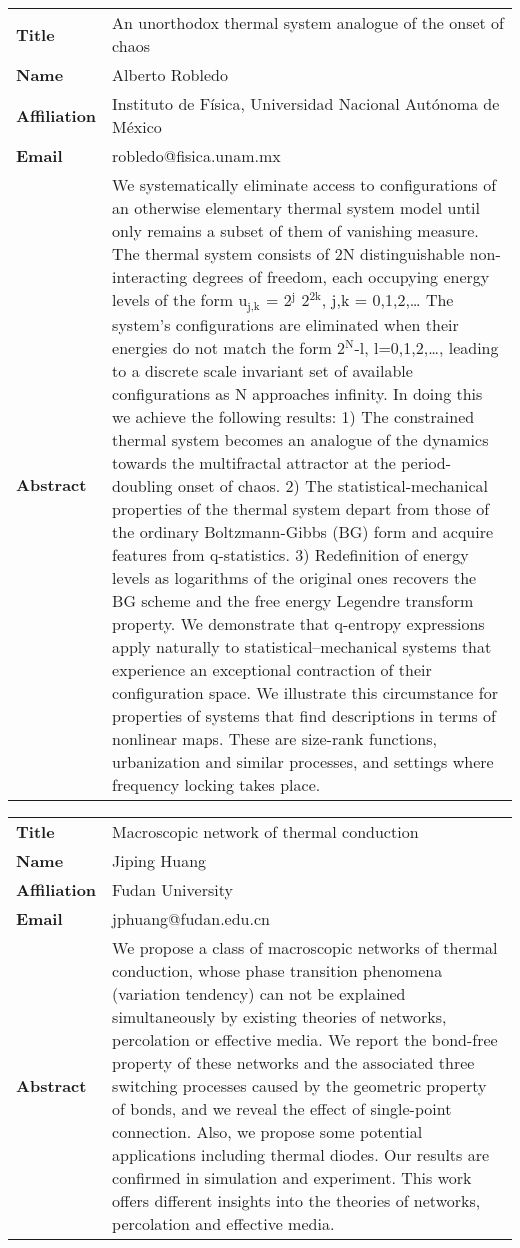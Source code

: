 \documentclass[oneside,A4paper,12pt]{article}
\begin{document}
\begin{longtable}{p{2cm}p{14cm}}
\toprule
\textbf{Title} & An unorthodox thermal system analogue of the onset of chaos\\
\textbf{Name} & Alberto Robledo\\
\textbf{Affiliation} & Instituto de Física, Universidad Nacional Autónoma de México\\
\textbf{Email} & robledo@fisica.unam.mx\\
\textbf{Abstract} & We systematically eliminate access to configurations of an otherwise elementary thermal system model until only remains a subset of them of vanishing measure. The thermal system consists of 2N distinguishable non-interacting degrees of freedom, each occupying energy levels of the form u\(_{\text{j,k}}\) = 2\(^{\text{j}}\) 2\(^{\text{2k}}\), j,k = 0,1,2,\ldots{} The system's configurations are eliminated when their energies do not match the form 2\(^{\text{N}}\)-l, l=0,1,2,\ldots{}, leading to a discrete scale invariant set of available configurations as N approaches infinity. In doing this we achieve the following results: 1) The constrained thermal system becomes an analogue of the dynamics towards the multifractal attractor at the period-doubling onset of chaos. 2) The statistical-mechanical properties of the thermal system depart from those of the ordinary Boltzmann-Gibbs (BG) form and acquire features from q-statistics. 3) Redefinition of energy levels as logarithms of the original ones recovers the BG scheme and the free energy Legendre transform property. We demonstrate that q-entropy expressions apply naturally to statistical–mechanical systems that experience an exceptional contraction of their configuration space. We illustrate this circumstance for properties of systems that find descriptions in terms of nonlinear maps. These are size-rank functions, urbanization and similar processes, and settings where frequency locking takes place.\\
\bottomrule
\end{longtable}

\newpage
\begin{longtable}{p{2cm}p{14cm}}
\toprule
\textbf{Title} & Macroscopic network of thermal conduction\\
\textbf{Name} & Jiping Huang\\
\textbf{Affiliation} & Fudan University\\
\textbf{Email} & jphuang@fudan.edu.cn\\
\textbf{Abstract} & We propose a class of macroscopic networks of thermal conduction, whose phase transition phenomena (variation tendency) can not be explained simultaneously by existing theories of networks, percolation or effective media. We report the bond-free property of these networks and the associated three switching processes caused by the geometric property of bonds, and we reveal the effect of single-point connection. Also, we propose some potential applications including thermal diodes. Our results are confirmed in simulation and experiment. This work offers different insights into the theories of networks, percolation and effective media.\\
\bottomrule
\end{longtable}
\end{document}
